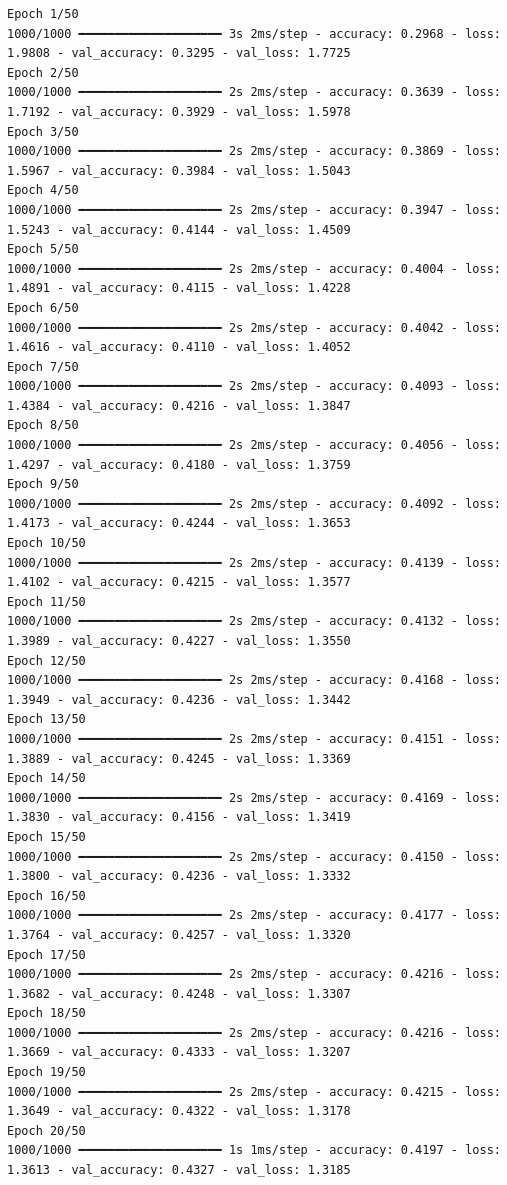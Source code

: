 \documentclass[
  letterpaper,
  DIV=11,
  numbers=noendperiod]{scrartcl}
\begin{document}
\begin{verbatim}
Epoch 1/50
1000/1000 ━━━━━━━━━━━━━━━━━━━━ 3s 2ms/step - accuracy: 0.2968 - loss: 1.9808 - val_accuracy: 0.3295 - val_loss: 1.7725
Epoch 2/50
1000/1000 ━━━━━━━━━━━━━━━━━━━━ 2s 2ms/step - accuracy: 0.3639 - loss: 1.7192 - val_accuracy: 0.3929 - val_loss: 1.5978
Epoch 3/50
1000/1000 ━━━━━━━━━━━━━━━━━━━━ 2s 2ms/step - accuracy: 0.3869 - loss: 1.5967 - val_accuracy: 0.3984 - val_loss: 1.5043
Epoch 4/50
1000/1000 ━━━━━━━━━━━━━━━━━━━━ 2s 2ms/step - accuracy: 0.3947 - loss: 1.5243 - val_accuracy: 0.4144 - val_loss: 1.4509
Epoch 5/50
1000/1000 ━━━━━━━━━━━━━━━━━━━━ 2s 2ms/step - accuracy: 0.4004 - loss: 1.4891 - val_accuracy: 0.4115 - val_loss: 1.4228
Epoch 6/50
1000/1000 ━━━━━━━━━━━━━━━━━━━━ 2s 2ms/step - accuracy: 0.4042 - loss: 1.4616 - val_accuracy: 0.4110 - val_loss: 1.4052
Epoch 7/50
1000/1000 ━━━━━━━━━━━━━━━━━━━━ 2s 2ms/step - accuracy: 0.4093 - loss: 1.4384 - val_accuracy: 0.4216 - val_loss: 1.3847
Epoch 8/50
1000/1000 ━━━━━━━━━━━━━━━━━━━━ 2s 2ms/step - accuracy: 0.4056 - loss: 1.4297 - val_accuracy: 0.4180 - val_loss: 1.3759
Epoch 9/50
1000/1000 ━━━━━━━━━━━━━━━━━━━━ 2s 2ms/step - accuracy: 0.4092 - loss: 1.4173 - val_accuracy: 0.4244 - val_loss: 1.3653
Epoch 10/50
1000/1000 ━━━━━━━━━━━━━━━━━━━━ 2s 2ms/step - accuracy: 0.4139 - loss: 1.4102 - val_accuracy: 0.4215 - val_loss: 1.3577
Epoch 11/50
1000/1000 ━━━━━━━━━━━━━━━━━━━━ 2s 2ms/step - accuracy: 0.4132 - loss: 1.3989 - val_accuracy: 0.4227 - val_loss: 1.3550
Epoch 12/50
1000/1000 ━━━━━━━━━━━━━━━━━━━━ 2s 2ms/step - accuracy: 0.4168 - loss: 1.3949 - val_accuracy: 0.4236 - val_loss: 1.3442
Epoch 13/50
1000/1000 ━━━━━━━━━━━━━━━━━━━━ 2s 2ms/step - accuracy: 0.4151 - loss: 1.3889 - val_accuracy: 0.4245 - val_loss: 1.3369
Epoch 14/50
1000/1000 ━━━━━━━━━━━━━━━━━━━━ 2s 2ms/step - accuracy: 0.4169 - loss: 1.3830 - val_accuracy: 0.4156 - val_loss: 1.3419
Epoch 15/50
1000/1000 ━━━━━━━━━━━━━━━━━━━━ 2s 2ms/step - accuracy: 0.4150 - loss: 1.3800 - val_accuracy: 0.4236 - val_loss: 1.3332
Epoch 16/50
1000/1000 ━━━━━━━━━━━━━━━━━━━━ 2s 2ms/step - accuracy: 0.4177 - loss: 1.3764 - val_accuracy: 0.4257 - val_loss: 1.3320
Epoch 17/50
1000/1000 ━━━━━━━━━━━━━━━━━━━━ 2s 2ms/step - accuracy: 0.4216 - loss: 1.3682 - val_accuracy: 0.4248 - val_loss: 1.3307
Epoch 18/50
1000/1000 ━━━━━━━━━━━━━━━━━━━━ 2s 2ms/step - accuracy: 0.4216 - loss: 1.3669 - val_accuracy: 0.4333 - val_loss: 1.3207
Epoch 19/50
1000/1000 ━━━━━━━━━━━━━━━━━━━━ 2s 2ms/step - accuracy: 0.4215 - loss: 1.3649 - val_accuracy: 0.4322 - val_loss: 1.3178
Epoch 20/50
1000/1000 ━━━━━━━━━━━━━━━━━━━━ 1s 1ms/step - accuracy: 0.4197 - loss: 1.3613 - val_accuracy: 0.4327 - val_loss: 1.3185

\end{verbatim}
\end{document}
